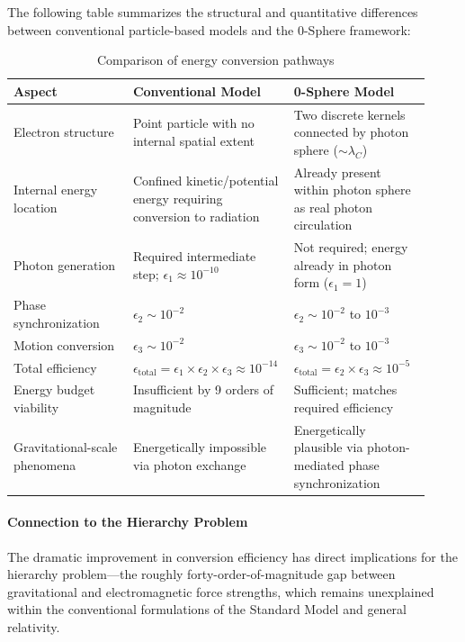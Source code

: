 \documentclass[12pt,letterpaper]{article}
\begin{document}
The following table summarizes the structural and quantitative differences between conventional particle-based models and the 0-Sphere framework:

\begin{table}[h!]
\centering
\caption{Comparison of energy conversion pathways}
\label{tab:efficiency_comparison}
\begin{tabular}{p{0.28\linewidth}p{0.32\linewidth}p{0.32\linewidth}}
\toprule
\textbf{Aspect} & \textbf{Conventional Model} & \textbf{0-Sphere Model} \\
\midrule
Electron structure & Point particle with no internal spatial extent & Two discrete kernels connected by photon sphere ($\sim \lambda_C$) \\
\midrule
Internal energy location & Confined kinetic/potential energy requiring conversion to radiation & Already present within photon sphere as real photon circulation \\
\midrule
Photon generation & Required intermediate step; $\epsilon_1 \approx 10^{-10}$ & Not required; energy already in photon form ($\epsilon_1 = 1$) \\
\midrule
Phase synchronization & $\epsilon_2 \sim 10^{-2}$ & $\epsilon_2 \sim 10^{-2}$ to $10^{-3}$ \\
\midrule
Motion conversion & $\epsilon_3 \sim 10^{-2}$ & $\epsilon_3 \sim 10^{-2}$ to $10^{-3}$ \\
\midrule
Total efficiency & $\epsilon_{\text{total}} = \epsilon_1 \times \epsilon_2 \times \epsilon_3 \approx 10^{-14}$ & $\epsilon_{\text{total}} = \epsilon_2 \times \epsilon_3 \approx 10^{-5}$ \\
\midrule
Energy budget viability & Insufficient by 9 orders of magnitude & Sufficient; matches required efficiency \\
\midrule
Gravitational-scale phenomena & Energetically impossible via photon exchange & Energetically plausible via photon-mediated phase synchronization \\
\bottomrule
\end{tabular}
\end{table}

\paragraph{Connection to the Hierarchy Problem}

The dramatic improvement in conversion efficiency has direct implications for the hierarchy problem—the roughly forty-order-of-magnitude gap between gravitational and electromagnetic force strengths, which remains unexplained within the conventional formulations of the Standard Model and general relativity.
\end{document}
